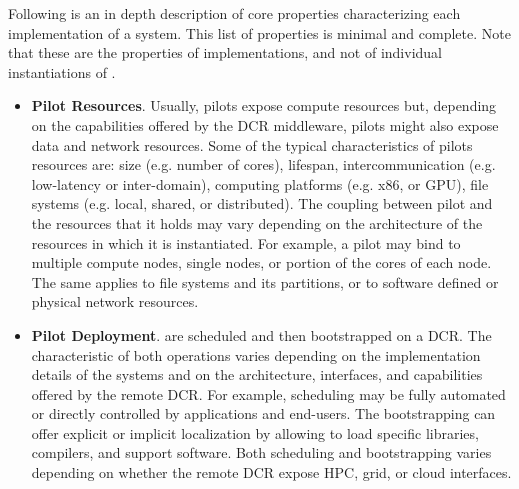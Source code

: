 \documentclass{sig-alternate}
\begin{document}
Following is an in depth description of core properties characterizing each
implementation of a \pilot system. This list of properties is minimal and
complete. Note that these are the properties of \pilot implementations, and not
of individual instantiations of \pilots.

\begin{itemize}

\item \textbf{Pilot Resources}. Usually, pilots expose compute resources but,
  depending on the capabilities offered by the DCR middleware, pilots might also
  expose data and network resources. Some of the typical characteristics of
  pilots resources are: size (e.g. number of cores), lifespan,
  intercommunication (e.g. low-latency or inter-domain), computing platforms
  (e.g. x86, or GPU), file systems (e.g. local, shared, or distributed). The
  coupling between pilot and the resources that it holds may vary depending on
  the architecture of the resources in which it is instantiated. For example, a
  pilot may bind to multiple compute nodes, single nodes, or portion of the
  cores of each node. The same applies to file systems and its partitions, or to
  software defined or physical network resources. 

\item \textbf{Pilot Deployment}. \pilots are scheduled and then bootstrapped on
  a DCR. The characteristic of both operations varies depending on the
  implementation details of the \pilot systems and on the architecture,
  interfaces, and capabilities offered by the remote DCR. For example, \pilot
  scheduling may be fully automated or directly controlled by applications and
  end-users. The bootstrapping can offer explicit or implicit localization by
  allowing to load specific libraries, compilers, and support software. Both
  scheduling and bootstrapping varies depending on whether the remote DCR expose
  HPC, grid, or cloud interfaces. 


\end{itemize}
\end{document}
